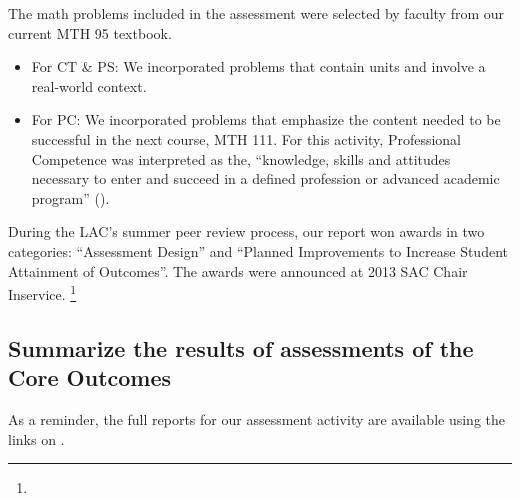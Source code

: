 \begin{description}
The math problems included in the assessment were selected by faculty from our
current MTH 95 textbook.
\begin{itemize}
\item For CT \& PS: We incorporated problems that contain units and involve a
  real-world context.
\item For PC:  We incorporated problems that emphasize the content needed to be
  successful in the next course, MTH 111.  For this activity, Professional
  Competence was interpreted as the, ``knowledge, skills and attitudes necessary
  to enter and succeed in a defined profession or advanced academic program''
  (\cite{coreoutcomes}).
\end{itemize}
During the LAC's summer peer review process, our report won awards in two
categories: ``Assessment Design'' and ``Planned Improvements to Increase Student
Attainment of Outcomes''.  The awards were announced at 2013 SAC Chair
Inservice. \footnote{\awardsurl}
\end{description}

\subsection{Summarize the results of assessments of the Core Outcomes}
As a reminder, the full reports for our assessment activity are available using
the links on .



